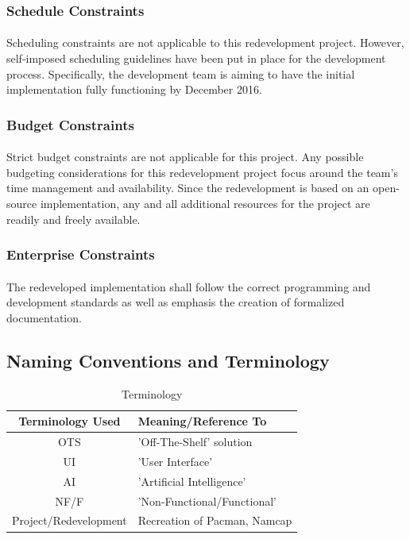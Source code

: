 \documentclass[12pt, titlepage]{article}
\begin{document}
\subsubsection{Schedule Constraints}
\paragraph{}
Scheduling constraints are not applicable to this redevelopment project. However, self-imposed scheduling guidelines have been put in place for the development process. Specifically, the development team is aiming to have the initial implementation fully functioning by December 2016.

\subsubsection{Budget Constraints}
\paragraph{}
Strict budget constraints are not applicable for this project. Any possible budgeting considerations for this redevelopment project focus around the team's time management and availability. Since the redevelopment is based on an open-source implementation, any and all additional resources for the project are readily and freely available.

\subsubsection{Enterprise Constraints}
\paragraph{}
The redeveloped implementation shall follow the correct programming and development standards as well as emphasis the creation of formalized documentation.

\subsection{Naming Conventions and Terminology}
\begin{table}[H]
\caption{Terminology} \label{tab:terms}
\begin{center}
\begin{tabular}{| c | l |}
\hline
\textbf{Terminology Used} & \textbf{Meaning/Reference To} \\ \hline
OTS & 'Off-The-Shelf' solution \\ \hline
UI & 'User Interface' \\ \hline
AI & 'Artificial Intelligence' \\ \hline
NF/F & 'Non-Functional/Functional' \\ \hline
Project/Redevelopment & Recreation of Pacman, Namcap \\
\hline
\end{tabular}
\end{center}
\end{table}
\end{document}
